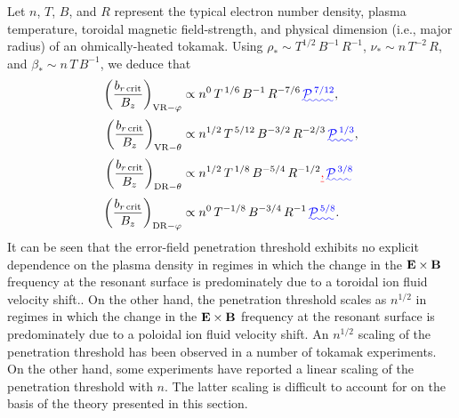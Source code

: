 \documentclass[12pt,prb,aps]{revtex4-1}
\providecommand{\DIFadd}[1]{{\protect\color{blue}\uwave{#1}}} %
\providecommand{\DIFdel}[1]{{\protect\color{red}\sout{#1}}}                      %
\providecommand{\DIFaddbegin}{} %
\providecommand{\DIFaddend}{} %
\providecommand{\DIFdelbegin}{} %
\providecommand{\DIFdelend}{} %
\begin{document}
Let $n$, $T$, $B$, and $R$ represent the typical electron number density, plasma temperature, toroidal magnetic field-strength,
and physical dimension (i.e., major radius) of an ohmically-heated tokamak. Using $\rho_\ast\sim T^{1/2}\,B^{-1}\,R^{-1}$, 
$\nu_\ast\sim n\,T^{-2}\,R$, and \DIFdelbegin \DIFdel{$\beta_\ast\sim n\,T\,B^{-1}$}\DIFdelend \DIFaddbegin \DIFadd{$\beta_\ast\sim n\,T\,B^{-2}$}\DIFaddend ,
we deduce that
\begin{align}
\left(\frac{b_{r\,{\rm crit}}}{B_z}\right)_{{\rm VR}-\varphi} &\propto n^{0}\,T^{\,1/6}\,B^{-1}\,R^{-7/6}\DIFaddbegin \DIFadd{\,{\cal P}^{\,7/12}}\DIFaddend ,\\[0.5ex]
\left(\frac{b_{r\,{\rm crit}}}{B_z}\right)_{{\rm VR}-\theta} &\propto n^{1/2}\,T^{\,5/12}\,B^{-3/2}\,R^{-2/3}\DIFaddbegin \DIFadd{\,{\cal P}^{\,1/3}}\DIFaddend ,\\[0.5ex]
\left(\frac{b_{r\,{\rm crit}}}{B_z}\right)_{{\rm DR}-\theta} &\propto n^{1/2}\,T^{\,1/8}\,B^{-5/4}\,R^{-1/2}\DIFdelbegin \DIFdel{,}\DIFdelend \DIFaddbegin \DIFadd{\,{\cal P}^{\,3/8}}\DIFaddend \\[0.5ex]
\left(\frac{b_{r\,{\rm crit}}}{B_z}\right)_{{\rm DR}-\varphi} &\propto n^{0}\,T^{-1/8}\,B^{-3/4}\,R^{-1}\DIFaddbegin \DIFadd{\,{\cal P}^{\,5/8}}\DIFaddend .
\end{align}
It can be seen that the error-field penetration threshold exhibits no explicit dependence on the plasma
density in regimes in which the change in the ${\bf E}\times {\bf B}$ frequency at the resonant surface is predominately due to a toroidal ion fluid 
velocity shift.\cite{rf1998,cole}. On the other hand, the penetration threshold
scales as $n^{1/2}$ in regimes in which the change in the ${\bf E}\times{\bf B}$ frequency at the resonant surface is predominately due to a  poloidal ion fluid velocity shift. An $n^{1/2}$ scaling of the penetration threshold has been observed in a number of tokamak
experiments.\cite{hender,wang1,wang2,lazzaro,park} 
On the other hand, some experiments have reported a linear scaling of the penetration threshold with $n$.\cite{scoville,wolf,wolfe,howell,menard,buttery} The latter
scaling is difficult to account for on the basis of the theory presented in this section. 
\end{document}
